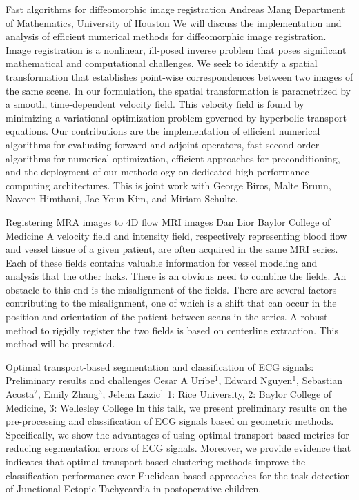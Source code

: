 \begin{addmargin}[2em]{0em}
\vspace{1.5ex}
\abs
{Fast algorithms for diffeomorphic image registration}
{Andreas Mang}
{Department of Mathematics, University of Houston}
{We will discuss the implementation and analysis of efficient numerical methods for diffeomorphic image registration. Image registration is a nonlinear, ill-posed inverse problem that poses significant mathematical and computational challenges. We seek to identify a spatial transformation that establishes point-wise correspondences between two images of the same scene. In our formulation, the spatial transformation is parametrized by a smooth, time-dependent velocity field. This velocity field is found by minimizing a variational optimization problem governed by hyperbolic transport equations. Our contributions are the implementation of efficient numerical algorithms for evaluating forward and adjoint operators, fast second-order algorithms for numerical optimization, efficient approaches for preconditioning, and the deployment of our methodology on dedicated high-performance computing architectures. This is joint work with George Biros, Malte Brunn, Naveen Himthani, Jae-Youn Kim, and Miriam Schulte.}


\vspace{1.5ex}
\abs
{Registering MRA images to 4D flow MRI images}
{Dan Lior}
{Baylor College of Medicine}
{A velocity field and intensity field, respectively representing blood flow and vessel tissue of a given patient, are often acquired in the same MRI series. Each of these fields contains valuable information for vessel modeling and analysis that the other lacks. There is an obvious need to combine the fields. An obstacle to this end is the misalignment of the fields. There are several factors contributing to the misalignment, one of which is a shift that can occur in the position and orientation of the patient between scans in the series. A robust method to rigidly register the two fields is based on centerline extraction. This method will be presented.}


\vspace{1.5ex}
\abs
{Optimal transport-based segmentation and classification of ECG signals: Preliminary results and challenges}
{Cesar A Uribe$^{1}$, Edward Nguyen$^{1}$, Sebastian Acosta$^{2}$, Emily Zhang$^{3}$, Jelena Lazic$^{1}$}
{1: Rice University, 2: Baylor College of Medicine, 3: Wellesley College }
{In this talk, we present preliminary results on the pre-processing and classification of ECG signals based on geometric methods. Specifically, we show the advantages of using optimal transport-based metrics for reducing segmentation errors of ECG signals. Moreover, we provide evidence that indicates that optimal transport-based clustering methods improve the classification performance over Euclidean-based approaches for the task detection of Junctional Ectopic Tachycardia in postoperative children.}



\end{addmargin}
